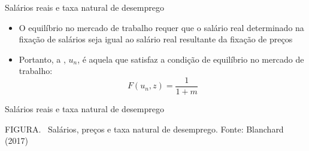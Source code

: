 \documentclass[10pt]{beamer}
\begin{document}
\begin{frame}
    {Salários reais e taxa natural de desemprego}
    \begin{itemize}
        \item O equilíbrio no mercado de trabalho requer que o salário real determinado na fixação de salários seja igual ao salário real resultante da fixação de preços\bigskip
        \item Portanto, a , $u_n$, é aquela que satisfaz a condição de equilíbrio no mercado de trabalho:
        \begin{equation}
            F(u_n, z) = \frac{1}{1 + m}
        \end{equation}        
    \end{itemize}
\end{frame}

\begin{frame}
    {Salários reais e taxa natural de desemprego}
    \begin{center}
		\begin{minipage}[b]{.6\textwidth}
			\tiny{{\scshape FIGURA}. \ Salários, preços e taxa natural de desemprego. Fonte: Blanchard (2017)} 
		\end{minipage}
	\end{center}
\end{frame}
\end{document}
